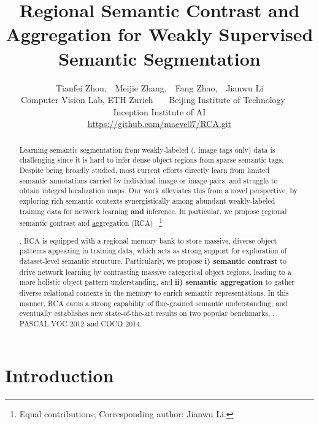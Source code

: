 \documentclass[10pt,twocolumn,letterpaper]{article}
\newcommand\blfootnote[1]{\begingroup
	\renewcommand\thefootnote{}\footnote{#1}\addtocounter{footnote}{-1}\endgroup
}
\begin{document}
\title{Regional Semantic Contrast and Aggregation for Weakly Supervised Semantic Segmentation}

\author{Tianfei Zhou,~~Meijie Zhang,~~Fang Zhao,~~Jianwu Li\\
	\small{ Computer Vision Lab, ETH Zurich}~~~\small{ Beijing Institute of Technology}~~~\small{
		Inception Institute of AI}\\
	\small\url{https://github.com/maeve07/RCA.git}
}


\maketitle

\begin{abstract}

		\vspace{-.5em}
	Learning semantic segmentation from weakly-labeled (\eg, image tags only) data  is challenging since it is hard to infer dense object regions from sparse semantic tags. Despite being broadly studied, most current efforts directly learn from limited semantic annotations carried by individual image or image pairs, and struggle to obtain integral localization maps. Our work alleviates this from a novel perspective, by exploring rich {semantic contexts} synergistically among {abundant} weakly-labeled training data for network learning \textbf{and} inference. In particular, we propose \underline{r}egional semantic \underline{c}ontrast and \underline{a}ggregation (RCA)~\blfootnote{ Equal contributions;  Corresponding author: Jianwu Li.}\!. RCA is equipped with a regional memory bank to store massive, diverse object patterns appearing in training data, which acts as strong support for exploration of dataset-level semantic structure. Particularly, we propose \textbf{i) semantic contrast} to drive network learning by contrasting massive categorical object regions, leading to a more holistic object pattern understanding,
	and \textbf{ii) semantic aggregation} to  gather diverse relational contexts in the memory to enrich semantic representations. In this manner, RCA earns a strong capability of fine-grained semantic understanding, and eventually establishes new state-of-the-art results on two popular benchmarks, \ie, PASCAL VOC 2012 and COCO 2014.
\vspace{-1em}

\end{abstract}

\section{Introduction}\label{sec:intro}
\end{document}
